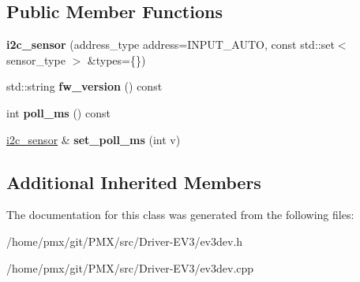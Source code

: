 \subsection*{Public Member Functions}
\begin{DoxyCompactItemize}
\item 
\mbox{\label{classev3dev_1_1i2c__sensor_aff21455a472d0d29e09b97b9d64dbad7}} 
{\bfseries i2c\+\_\+sensor} (address\+\_\+type address=I\+N\+P\+U\+T\+\_\+\+A\+U\+TO, const std\+::set$<$ sensor\+\_\+type $>$ \&types=\{\})
\item 
\mbox{\label{classev3dev_1_1i2c__sensor_ac5a5ccf85d67da8b5fc920f48a529771}} 
std\+::string {\bfseries fw\+\_\+version} () const
\item 
\mbox{\label{classev3dev_1_1i2c__sensor_a1ea43d78a69b32e9937b803f9788710e}} 
int {\bfseries poll\+\_\+ms} () const
\item 
\mbox{\label{classev3dev_1_1i2c__sensor_a1929cf4da18deadb62a3cb2c9f9bba77}} 
\hyperlink{classev3dev_1_1i2c__sensor}{i2c\+\_\+sensor} \& {\bfseries set\+\_\+poll\+\_\+ms} (int v)
\end{DoxyCompactItemize}
\subsection*{Additional Inherited Members}


The documentation for this class was generated from the following files\+:\begin{DoxyCompactItemize}
\item 
/home/pmx/git/\+P\+M\+X/src/\+Driver-\/\+E\+V3/ev3dev.\+h\item 
/home/pmx/git/\+P\+M\+X/src/\+Driver-\/\+E\+V3/ev3dev.\+cpp\end{DoxyCompactItemize}
